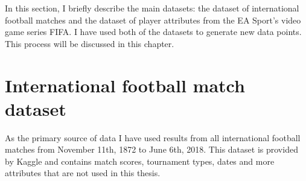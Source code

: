 In this section, I briefly describe the main datasets: the dataset of international football matches and the dataset of player attributes from the EA Sport's video game series FIFA. I have used both of the datasets to generate new data points. This process will be discussed in this chapter.

\section{International football match dataset}
As the primary source of data I have used results from all international football matches from November 11th, 1872 to June 6th, 2018. This dataset is provided by Kaggle \cite{matchdb} and contains match scores, tournament types, dates and more attributes that are not used in this thesis.

